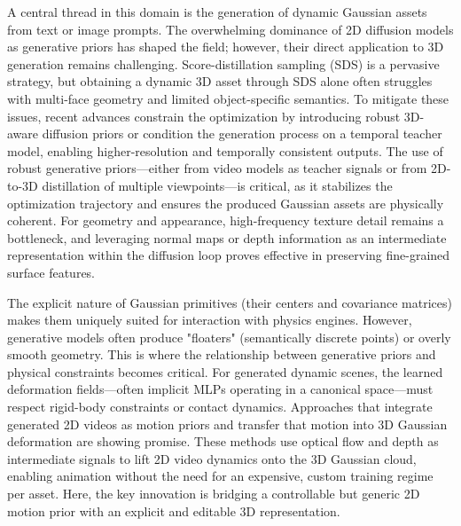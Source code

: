 \documentclass[11pt,a4paper]{article}
\begin{document}
A central thread in this domain is the generation of dynamic Gaussian assets from text or image prompts. The overwhelming dominance of 2D diffusion models as generative priors has shaped the field; however, their direct application to 3D generation remains challenging. Score-distillation sampling (SDS) is a pervasive strategy, but obtaining a dynamic 3D asset through SDS alone often struggles with multi-face geometry and limited object-specific semantics. To mitigate these issues, recent advances constrain the optimization by introducing robust 3D-aware diffusion priors or condition the generation process on a temporal teacher model, enabling higher-resolution and temporally consistent outputs. The use of robust generative priors---either from video models as teacher signals or from 2D-to-3D distillation of multiple viewpoints---is critical, as it stabilizes the optimization trajectory and ensures the produced Gaussian assets are physically coherent. For geometry and appearance, high-frequency texture detail remains a bottleneck, and leveraging normal maps or depth information as an intermediate representation within the diffusion loop proves effective in preserving fine-grained surface features.

The explicit nature of Gaussian primitives (their centers and covariance matrices) makes them uniquely suited for interaction with physics engines. However, generative models often produce "floaters" (semantically discrete points) or overly smooth geometry. This is where the relationship between generative priors and physical constraints becomes critical. For generated dynamic scenes, the learned deformation fields---often implicit MLPs operating in a canonical space---must respect rigid-body constraints or contact dynamics. Approaches that integrate generated 2D videos as motion priors and transfer that motion into 3D Gaussian deformation are showing promise. These methods use optical flow and depth as intermediate signals to lift 2D video dynamics onto the 3D Gaussian cloud, enabling animation without the need for an expensive, custom training regime per asset. Here, the key innovation is bridging a controllable but generic 2D motion prior with an explicit and editable 3D representation.
\end{document}
